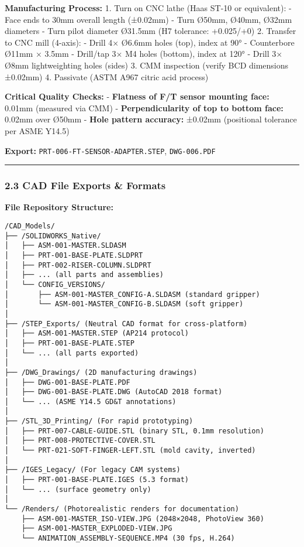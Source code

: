 \documentclass[
]{article}
\begin{document}
\textbf{Manufacturing Process:} 1. Turn on CNC lathe (Haas ST-10 or
equivalent): - Face ends to 30mm overall length (±0.02mm) - Turn Ø50mm,
Ø40mm, Ø32mm diameters - Turn pilot diameter Ø31.5mm (H7 tolerance:
+0.025/+0) 2. Transfer to CNC mill (4-axis): - Drill 4× Ø6.6mm holes
(top), index at 90° - Counterbore Ø11mm × 3.5mm - Drill/tap 3× M4 holes
(bottom), index at 120° - Drill 3× Ø8mm lightweighting holes (sides) 3.
CMM inspection (verify BCD dimensions ±0.02mm) 4. Passivate (ASTM A967
citric acid process)

\textbf{Critical Quality Checks:} - \textbf{Flatness of F/T sensor
mounting face:} 0.01mm (measured via CMM) - \textbf{Perpendicularity of
top to bottom face:} 0.02mm over Ø50mm - \textbf{Hole pattern accuracy:}
±0.02mm (positional tolerance per ASME Y14.5)

\textbf{Export:} \texttt{PRT-006-FT-SENSOR-ADAPTER.STEP},
\texttt{DWG-006.PDF}

\begin{center}\rule{0.5\linewidth}{0.5pt}\end{center}

\hypertarget{cad-file-exports-formats}{%
\subsubsection{2.3 CAD File Exports \&
Formats}\label{cad-file-exports-formats}}

\textbf{File Repository Structure:}

\begin{verbatim}
/CAD_Models/
├── /SOLIDWORKS_Native/
│   ├── ASM-001-MASTER.SLDASM
│   ├── PRT-001-BASE-PLATE.SLDPRT
│   ├── PRT-002-RISER-COLUMN.SLDPRT
│   ├── ... (all parts and assemblies)
│   └── CONFIG_VERSIONS/
│       ├── ASM-001-MASTER_CONFIG-A.SLDASM (standard gripper)
│       └── ASM-001-MASTER_CONFIG-B.SLDASM (soft gripper)
│
├── /STEP_Exports/ (Neutral CAD format for cross-platform)
│   ├── ASM-001-MASTER.STEP (AP214 protocol)
│   ├── PRT-001-BASE-PLATE.STEP
│   └── ... (all parts exported)
│
├── /DWG_Drawings/ (2D manufacturing drawings)
│   ├── DWG-001-BASE-PLATE.PDF
│   ├── DWG-001-BASE-PLATE.DWG (AutoCAD 2018 format)
│   └── ... (ASME Y14.5 GD&T annotations)
│
├── /STL_3D_Printing/ (For rapid prototyping)
│   ├── PRT-007-CABLE-GUIDE.STL (binary STL, 0.1mm resolution)
│   ├── PRT-008-PROTECTIVE-COVER.STL
│   └── PRT-021-SOFT-FINGER-LEFT.STL (mold cavity, inverted)
│
├── /IGES_Legacy/ (For legacy CAM systems)
│   ├── PRT-001-BASE-PLATE.IGES (5.3 format)
│   └── ... (surface geometry only)
│
└── /Renders/ (Photorealistic renders for documentation)
    ├── ASM-001-MASTER_ISO-VIEW.JPG (2048×2048, PhotoView 360)
    ├── ASM-001-MASTER_EXPLODED-VIEW.JPG
    └── ANIMATION_ASSEMBLY-SEQUENCE.MP4 (30 fps, H.264)
\end{verbatim}
\end{document}
